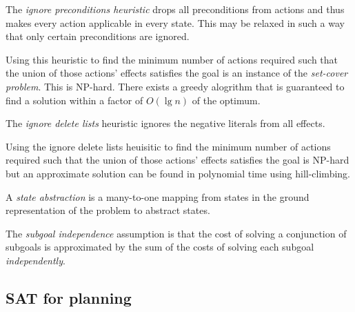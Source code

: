 \documentclass{article}
\begin{document}
\begin{theorem}[R\&N p. 376]
	The \emph{ignore preconditions heuristic} drops all preconditions from actions
	and thus makes every action applicable in every state. This may be relaxed in
	such a way that only certain preconditions are ignored.

	Using this heuristic to find the minimum number of
	actions required such that the union of those actions'
	effects satisfies the goal is an instance of the \emph{set-cover problem}. This
	is NP-hard. There exists a greedy alogrithm that is guaranteed to find a solution
	within a factor of $O(\lg n)$ of the optimum.
\end{theorem}

\begin{theorem}[R\&N p. 377]
	The \emph{ignore delete lists} heuristic ignores the negative literals from all
	effects.

	Using the ignore delete lists heuisitic to find the minimum number of actions
	required such that the union of those actions' effects satisfies the goal
	is NP-hard but an approximate solution can be found in polynomial time using
	hill-climbing.
\end{theorem}

\begin{definition}
	A \emph{state abstraction} is a many-to-one mapping from states in the ground
	representation of the problem to abstract states.
\end{definition}

\begin{definition}
	The \emph{subgoal independence} assumption is that the cost of solving a conjunction
	of subgoals is approximated by the sum of the costs of solving each subgoal
	\emph{independently}.
\end{definition}

\subsection{SAT for planning}
\end{document}
